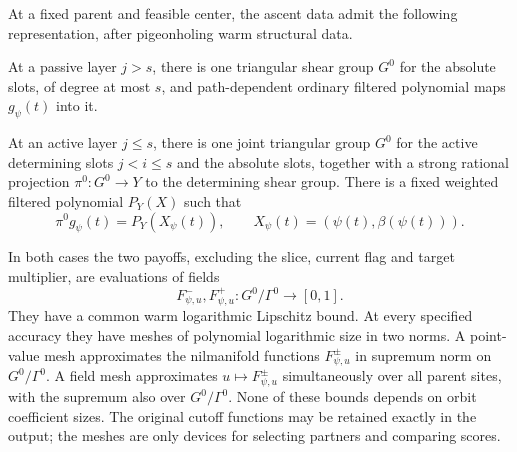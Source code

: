 \begin{lemma}
\label{ap:ascent:representation}
At a fixed parent and feasible center, the ascent data admit the
following representation, after pigeonholing warm structural data.

At a passive layer $j>s$, there is one triangular shear group $G^0$
for the absolute slots, of degree at most $s$, and path-dependent
ordinary filtered polynomial maps $g_\psi(t)$ into it.

At an active layer $j\leq s$, there is one joint triangular group
$G^0$ for the active determining slots $j<i\leq s$ and the absolute
slots, together with a strong rational projection
$\pi^0:G^0\to Y$ to the determining shear group.
There is a fixed
weighted filtered polynomial $P_Y(X)$ such that
\begin{equation}\label{ap:ascent:marking}
 \pi^0g_\psi(t)=P_Y(X_\psi(t)),\qquad
 X_\psi(t)=(\psi(t),\beta(\psi(t))).
\end{equation}

In both cases the two payoffs, excluding the slice, current flag
and target multiplier, are evaluations of fields
\[
 F^-_{\psi,u},F^+_{\psi,u}:G^0/\Gamma^0\longrightarrow[0,1].
\]
They have a common warm logarithmic Lipschitz bound.  At every
specified accuracy they have meshes of polynomial logarithmic size
in two norms.  A point-value mesh approximates the nilmanifold
functions $F^\pm_{\psi,u}$ in supremum norm on $G^0/\Gamma^0$.
A field mesh approximates $u\mapsto F^\pm_{\psi,u}$ simultaneously
over all parent sites, with the supremum also over $G^0/\Gamma^0$.
None of these bounds depends on orbit coefficient sizes.  The original
cutoff functions may be retained exactly in the output; the meshes
are only devices for selecting partners and comparing scores.
\end{lemma}

